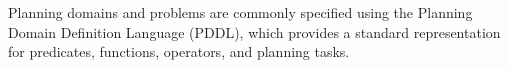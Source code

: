 Planning domains and problems are commonly specified using the Planning Domain Definition Language (PDDL), which provides a standard representation for predicates, functions, operators, and planning tasks.

